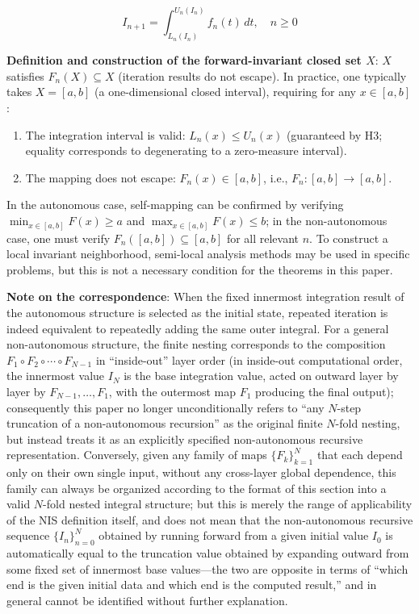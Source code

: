 \documentclass[11pt,a4paper]{amsart}
\begin{document}
\begin{equation}
\label{eq:iteration}
I_{n+1} = \int_{L_n(I_n)}^{U_n(I_n)} f_n(t) \, dt, \quad n \ge 0
\end{equation}

\textbf{Definition and construction of the forward-invariant closed set $X$}: $X$ satisfies $F_n(X) \subseteq X$ (iteration results do not escape). In practice, one typically takes $X = [a,b]$ (a one-dimensional closed interval), requiring for any $x \in [a,b]$:

\begin{enumerate}
\item The integration interval is valid: $L_n(x) \le U_n(x)$ (guaranteed by H3; equality corresponds to degenerating to a zero-measure interval).
\item The mapping does not escape: $F_n(x) \in [a,b]$, i.e., $F_n: [a,b] \to [a,b]$.
\end{enumerate}

In the autonomous case, self-mapping can be confirmed by verifying $\min_{x\in[a,b]} F(x) \ge a$ and $\max_{x\in[a,b]} F(x) \le b$; in the non-autonomous case, one must verify $F_n([a,b]) \subseteq [a,b]$ for all relevant $n$. To construct a local invariant neighborhood, semi-local analysis methods may be used in specific problems, but this is not a necessary condition for the theorems in this paper.

\textbf{Note on the correspondence}: When the fixed innermost integration result of the autonomous structure is selected as the initial state, repeated iteration is indeed equivalent to repeatedly adding the same outer integral. For a general non-autonomous structure, the finite nesting corresponds to the composition $F_1 \circ F_2 \circ \cdots \circ F_{N-1}$ in ``inside-out'' layer order (in inside-out computational order, the innermost value $I_N$ is the base integration value, acted on outward layer by layer by $F_{N-1}, \dots, F_1$, with the outermost map $F_1$ producing the final output); consequently this paper no longer unconditionally refers to ``any $N$-step truncation of a non-autonomous recursion'' as the original finite $N$-fold nesting, but instead treats it as an explicitly specified non-autonomous recursive representation. Conversely, given any family of maps $\{F_k\}_{k=1}^N$ that each depend only on their own single input, without any cross-layer global dependence, this family can always be organized according to the format of this section into a valid $N$-fold nested integral structure; but this is merely the range of applicability of the NIS definition itself, and does not mean that the non-autonomous recursive sequence $\{I_n\}_{n=0}^N$ obtained by running forward from a given initial value $I_0$ is automatically equal to the truncation value obtained by expanding outward from some fixed set of innermost base values---the two are opposite in terms of ``which end is the given initial data and which end is the computed result,'' and in general cannot be identified without further explanation.
\end{document}
